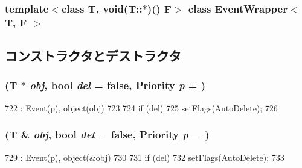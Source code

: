 \subsubsection*{template$<$class T, void(T::$\ast$)() F$>$ class EventWrapper$<$ T, F $>$}



\subsection{コンストラクタとデストラクタ}
\hypertarget{classEventWrapper_a3d9e3a20f104924988d16bcb11016d3d}{
\subsubsection[{EventWrapper}]{ (T $\ast$ {\em obj}, \/  bool {\em del} = {\ttfamily false}, \/  {\bf Priority} {\em p} = {})}}
\label{classEventWrapper_a3d9e3a20f104924988d16bcb11016d3d}



\begin{DoxyCode}
722         : Event(p), object(obj)
723     {
724         if (del)
725             setFlags(AutoDelete);
726     }
\end{DoxyCode}
\hypertarget{classEventWrapper_a77b6c62cc5484c5f144960b7f6a74fe3}{
\subsubsection[{EventWrapper}]{ (T \& {\em obj}, \/  bool {\em del} = {\ttfamily false}, \/  {\bf Priority} {\em p} = {})}}
\label{classEventWrapper_a77b6c62cc5484c5f144960b7f6a74fe3}



\begin{DoxyCode}
729         : Event(p), object(&obj)
730     {
731         if (del)
732             setFlags(AutoDelete);
733     }
\end{DoxyCode}


